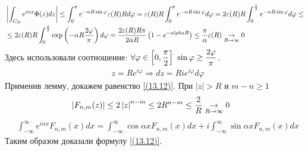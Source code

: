 \begin{align*}
  & \left| \int_{C_R}e^{i \alpha z}\Phi(z) dz \right| \leq \int_{0}^{\pi}e^{-\alpha R \sin \varphi}\varepsilon(R) R d \varphi = \varepsilon(R) R \int_{0}^{\pi}e^{-\alpha R \sin \varphi}d \varphi = 2 \varepsilon(R) R \int_{0}^{\frac{\pi}{2}}e^{-\alpha R \sin \varphi}d \varphi \leq \\
  & \leq 2 \varepsilon(R) R \int_{0}^{\frac{\pi}{2}}\exp\left( -\alpha R \frac{2 \varphi}{\pi} \right) d \varphi = \frac{2 \varepsilon(R) R \pi}{2 \alpha R}\left( 1 - e^{-alpha R} \right) \leq \frac{\pi}{\alpha} \varepsilon(R) \underset{R \to \infty}{\to} 0
\end{align*}
Здесь использовали соотношение: $\forall \varphi \in \left[ 0, \displaystyle
    \frac{\pi}{2} \right] \ \sin \varphi \geq \displaystyle \frac{2 \varphi}{\pi}$.
\begin{align*}
  & z = R e^{i \varphi} \Rightarrow dz = R i e^{i \varphi} d \varphi
\end{align*}
Применив лемму, докажем равенство \eqref{(13.12)}. При $\left| z \right| > R$ и
$m-n \geq 1$
\begin{align*}
  & \left| F_{n,m}(z) \right| \leq 2 \left| z \right|^{n-m} \leq 2 R^{n-m} \leq \frac{2}{R} \underset{R \to \infty}{\to} 0
\end{align*}
\begin{align*}
  & \int_{-\infty}^\infty e^{i \alpha x}F_{n,m}(x) dx = \int_{-\infty}^\infty \cos\alpha xF_{n,m}(x) dx + i \int_{-\infty}^\infty \sin \alpha x F_{n,m}(x) dx
\end{align*}
Таким образом доказали формулу \eqref{(13.12)}.
